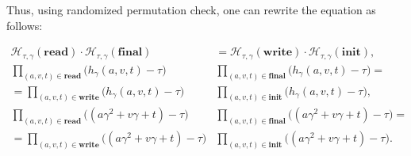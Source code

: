 \documentclass[../../book]{subfiles}
\begin{document}
Thus, using randomized permutation check, one can rewrite the equation as follows:
\begin{small}
\begin{align*}
    \mathcal{H}_{\tau,\gamma}(\mathbf{read}) \cdot \mathcal{H}_{\tau,\gamma}(\mathbf{final})& = 
    \mathcal{H}_{\tau,\gamma}(\mathbf{write}) \cdot \mathcal{H}_{\tau,\gamma}(\mathbf{init}),\\
    \prod_{(a,v,t)\in \mathbf{read}}\bigl(h_{\gamma}(a,v,t)-\tau\bigr) &\prod_{(a,v,t)\in \mathbf{final}}\bigl(h_{\gamma}(a,v,t)-\tau\bigr) = \\
    = \prod_{(a,v,t)\in \mathbf{write}}\bigl(h_{\gamma}(a,v,t)-\tau\bigr)& \prod_{(a,v,t)\in \mathbf{init}}\bigl(h_{\gamma}(a,v,t)-\tau\bigr), \\
    \prod_{(a,v,t)\in \mathbf{read}}\bigl((a\gamma^2+v\gamma+t)-\tau\bigr) &\prod_{(a,v,t)\in \mathbf{final}}\bigl((a\gamma^2+v\gamma+t)-\tau\bigr) = \\
    = \prod_{(a,v,t)\in \mathbf{write}}\bigl((a\gamma^2+v\gamma+t)-\tau\bigr)& \prod_{(a,v,t)\in \mathbf{init}}\bigl((a\gamma^2+v\gamma+t)-\tau\bigr).
\end{align*}
\end{small}
\end{document}
